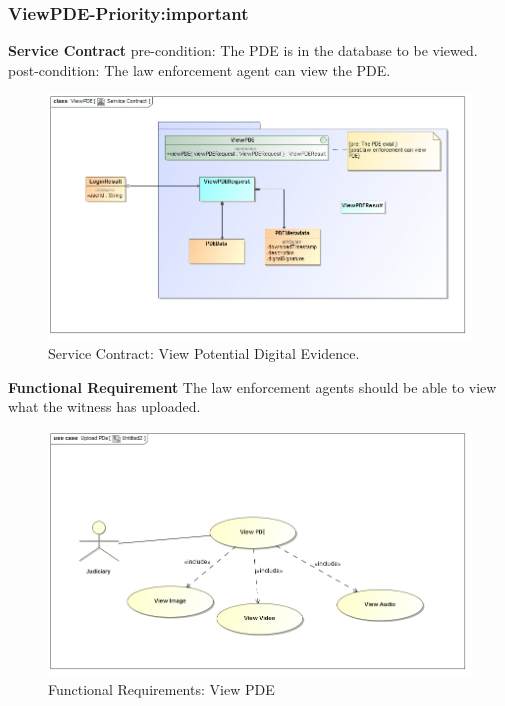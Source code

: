 \documentclass[a4paper,12pt]{article}
\begin{document}
\subsubsection{ViewPDE-Priority:important}
\textbf{Service Contract}\newline
pre-condition: The PDE is in the database to be viewed.\newline
post-condition: The law enforcement agent can view the PDE.\newline
\begin{figure}[H]
\includegraphics[width=\textwidth]{images/viewServiceContract.jpg}
\caption{Service Contract: View Potential Digital Evidence.\label{overflow}}
\end{figure}\newpage
\textbf{Functional Requirement}\newline
The law enforcement agents should be able to view what the witness has uploaded.\newline
\begin{figure}[H]
\includegraphics[width=\textwidth]{images/view.jpg}
\caption{Functional Requirements: View PDE\label{overflow}}
\end{figure}
\newpage
\end{document}
